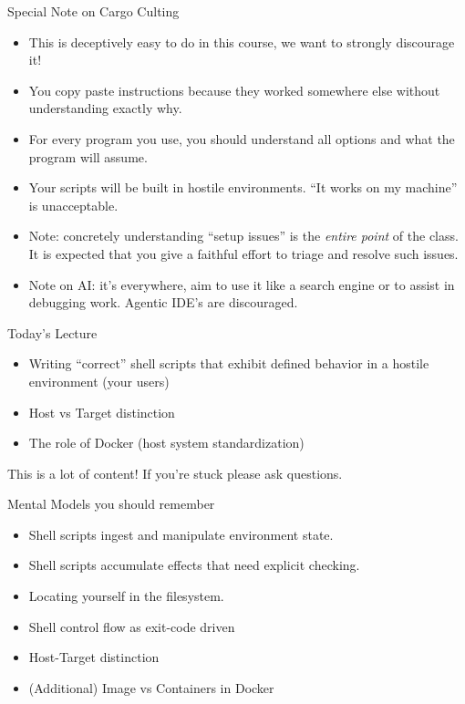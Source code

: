 \documentclass{../lecture}
\begin{document}
\begin{frame}{Special Note on Cargo Culting}
  \begin{itemize}
    \item This is deceptively easy to do in this course, we want to strongly
      discourage it!
    \item You copy paste instructions because they worked somewhere else without
      understanding exactly why.
    \item For every program you use, you should understand all options and what
      the program will assume.
    \item Your scripts will be built in hostile environments. ``It works on my
      machine'' is unacceptable.
    \item Note: concretely understanding ``setup issues'' is the \textit{entire
      point} of the class. It is expected that you give a faithful effort to
      triage and resolve such issues.
    \item Note on AI: it's everywhere, aim to use it like a search
      engine or to assist in debugging work. Agentic IDE's are discouraged.
  \end{itemize}
\end{frame}

\begin{frame}{Today's Lecture}
  \begin{itemize}
    \item Writing ``correct'' shell scripts that exhibit defined behavior in a
      hostile environment (your users)
    \item Host vs Target distinction
    \item The role of Docker (host system standardization)
  \end{itemize}
  This is a lot of content! If you're stuck please ask questions.
  \begin{block}{Mental Models you should remember}
    \begin{itemize}
      \item Shell scripts ingest and manipulate environment state.
      \item Shell scripts accumulate effects that need explicit checking.
      \item Locating yourself in the filesystem.
      \item Shell control flow as exit-code driven
      \item Host-Target distinction
      \item (Additional) Image vs Containers in Docker
    \end{itemize}
  \end{block}
\end{frame}
\end{document}
